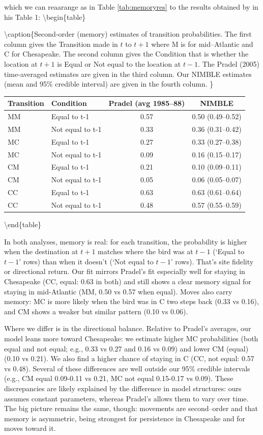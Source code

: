 \documentclass[
  12pt,
]{krantz}
\begin{document}
which we can reaarange as in Table \ref{tab:memoryres} to the results obtained by \citet{pradel_multievent_2005} in his Table 1:
\textbackslash begin\{table\}

\textbackslash caption\{\label{tab:memoryres}Second-order (memory) estimates of transition probabilities. The first column gives the Transition made in \(t\) to \(t+1\) where M is for mid--Atlantic and C for Chesapeake. The second column gives the Condition that is whether the location at \(t+1\) is Equal or Not equal to the location at \(t-1\). The Pradel (2005) time-averaged estimates are given in the third column. Our NIMBLE estimates (mean and 95\% credible interval) are given in the fourth column. \}
\centering

\begin{tabular}[t]{l|l|c|c}
\hline
Transition & Condition & Pradel (avg 1985–88) & NIMBLE\\
\hline
MM & Equal to t-1 & 0.57 & 0.50 (0.49–0.52)\\
\hline
MM & Not equal to t-1 & 0.33 & 0.36 (0.31–0.42)\\
\hline
MC & Equal to t-1 & 0.27 & 0.33 (0.27–0.38)\\
\hline
MC & Not equal to t-1 & 0.09 & 0.16 (0.15–0.17)\\
\hline
CM & Equal to t-1 & 0.21 & 0.10 (0.09–0.11)\\
\hline
CM & Not equal to t-1 & 0.05 & 0.06 (0.05–0.07)\\
\hline
CC & Equal to t-1 & 0.63 & 0.63 (0.61–0.64)\\
\hline
CC & Not equal to t-1 & 0.48 & 0.57 (0.55–0.59)\\
\hline
\end{tabular}

\textbackslash end\{table\}

In both analyses, memory is real: for each transition, the probability is higher when the destination at \(t+1\) matches where the bird was at \(t−1\) (`Equal to \(t-1\)' rows) than when it doesn't (`Not equal to \(t-1\)' rows). That's site fidelity or directional return. Our fit mirrors Pradel's fit especially well for staying in Chesapeake (CC, equal: 0.63 in both) and still shows a clear memory signal for staying in mid-Atlantic (MM, 0.50 vs 0.57 when equal). Moves also carry memory: MC is more likely when the bird was in C two steps back (0.33 vs 0.16), and CM shows a weaker but similar pattern (0.10 vs 0.06).

Where we differ is in the directional balance. Relative to Pradel's averages, our model leans more toward Chesapeake: we estimate higher MC probabilities (both equal and not equal; e.g., 0.33 vs 0.27 and 0.16 vs 0.09) and lower CM (equal) (0.10 vs 0.21). We also find a higher chance of staying in C (CC, not equal: 0.57 vs 0.48). Several of these differences are well outside our 95\% credible intervals (e.g., CM equal 0.09-0.11 vs 0.21, MC not equal 0.15-0.17 vs 0.09). These discrepancies are likely explained by the difference in model structures: ours assumes constant parameters, whereas Pradel's allows them to vary over time. The big picture remains the same, though: movements are second--order and that memory is asymmetric, being strongest for persistence in Chesapeake and for moves toward it.
\end{document}
